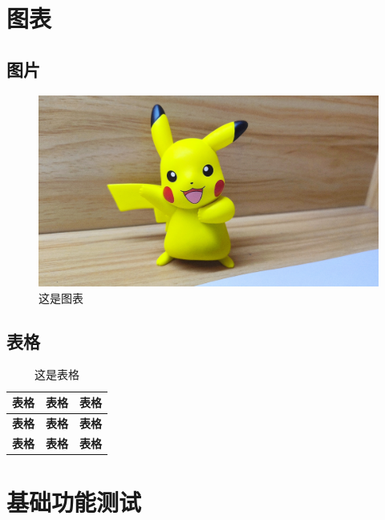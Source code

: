 \begin{ujnbody}
    \section{图表}

    \subsection{图片}

    \begin{figure}[htbp]
        \centering
        \includegraphics[scale=0.1, ]{figures/pikachu.jpg}
        \caption{这是图表}
    \end{figure}

    \subsection{表格}

    \begin{table}[htbp]
        \centering
        \caption{这是表格}
        \begin{tabular}{|c|c|c|}
            \hline
            \multicolumn{1}{|c|}{\textbf{表格}} & \multicolumn{1}{c|}{\textbf{表格}} & \multicolumn{1}{c|}{\textbf{表格}} \\ \hline
            \multicolumn{1}{|c|}{\textbf{表格}} & \multicolumn{1}{c|}{\textbf{表格}} & \multicolumn{1}{c|}{\textbf{表格}} \\ \hline
            \multicolumn{1}{|c|}{\textbf{表格}} & \multicolumn{1}{c|}{\textbf{表格}} & \multicolumn{1}{c|}{\textbf{表格}} \\ \hline
        \end{tabular}
    \end{table}
    \section{基础功能测试}

\end{ujnbody}
